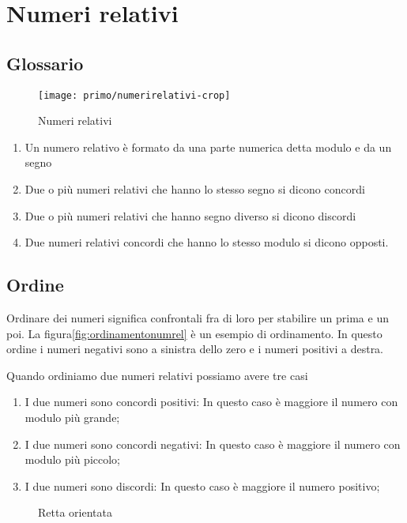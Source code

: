 \chapter{Numeri relativi}
\label{sha:numerirelativi}
\section{Glossario}
\begin{figure}
	\centering
	\texttt{[image: primo/numerirelativi-crop]}
	\caption{Numeri relativi}
	\label{fig:numORealativi}
\end{figure}
\begin{enumerate}
	\item Un numero relativo è formato da una parte numerica detta modulo e da un segno
	\item Due o più numeri relativi che hanno lo stesso segno si dicono concordi
	\item Due o più numeri relativi che hanno  segno diverso si dicono discordi
	\item Due numeri relativi concordi che hanno lo stesso modulo si dicono opposti.
\end{enumerate}
\section{Ordine}
Ordinare dei numeri significa confrontali fra di loro per stabilire un prima e un poi. La figura\nobs\vref{fig:ordinamentonumrel} è un esempio di ordinamento. In questo ordine i numeri negativi sono a sinistra dello zero e i numeri positivi a destra. 

Quando ordiniamo due numeri relativi possiamo avere tre casi
\begin{enumerate}
	\item I due numeri sono concordi positivi: In questo caso è maggiore il numero con modulo più grande;
	\item I due numeri sono concordi negativi: In questo caso è maggiore il numero con modulo più piccolo;
	\item  I due numeri sono discordi: In questo caso è maggiore il numero positivo;
\end{enumerate}
\begin{figure} 
	\centering

	\caption{Retta orientata}
	\label{fig:ordinamentonumrel}\end{figure}
